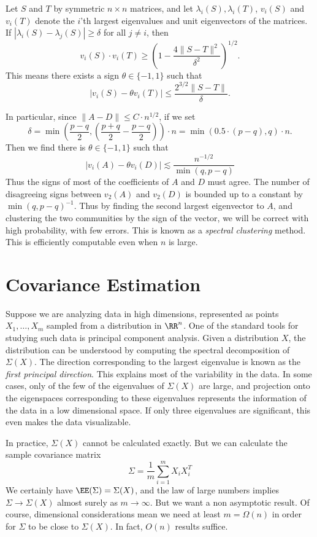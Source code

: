 \begin{theorem}
	Let $S$ and $T$ by symmetric $n \times n$ matrices, and let $\lambda_i(S), \lambda_i(T)$, $v_i(S)$ and $v_i(T)$ denote the $i$'th largest eigenvalues and unit eigenvectors of the matrices. If $|\lambda_i(S) - \lambda_j(S)| \geq \delta$ for all $j \neq i$, then
	\[ v_i(S) \cdot v_i(T) \geq \left( 1 - \frac{4 \| S - T \|^2}{\delta^2} \right)^{1/2}. \]
	This means there exists a sign $\theta \in \{ -1, 1 \}$ such that
	\[ |v_i(S) - \theta v_i(T)| \leq \frac{2^{3/2} \| S - T \|}{\delta}. \]
\end{theorem}

In particular, since $\| A - D \| \leq C \cdot n^{1/2}$, if we set
%
\[ \delta = \min \left( \frac{p - q}{2}, \left( \frac{p + q}{2} - \frac{p - q}{2} \right) \right) \cdot n = \min(0.5 \cdot (p-q), q) \cdot n. \]
%
Then we find there is $\theta \in \{ -1 , 1 \}$ such that
%
\[ |v_i(A) - \theta v_i(D)| \lesssim \frac{n^{-1/2}}{\min(q,p-q)} \]
%
Thus the signs of most of the coefficients of $A$ and $D$ must agree. The number of disagreeing signs between $v_2(A)$ and $v_2(D)$ is bounded up to a constant by $\min(q,p-q)^{-1}$. Thus by finding the second largest eigenvector to $A$, and clustering the two communities by the sign of the vector, we will be correct with high probability, with few errors. This is known as a \emph{spectral clustering} method. This is efficiently computable even when $n$ is large.

\section{Covariance Estimation}

Suppose we are analyzing data in high dimensions, represented as points $X_1, \dots, X_m$ sampled from a distribution in $\RR^n$. One of the standard tools for studying such data is principal component analysis. Given a distribution $X$, the distribution can be understood by computing the spectral decomposition of $\Sigma(X)$. The direction corresponding to the largest eigenvalue is known as the \emph{first principal direction}. This explains most of the variability in the data. In some cases, only of the few of the eigenvalues of $\Sigma(X)$ are large, and projection onto the eigenspaces corresponding to these eigenvalues represents the information of the data in a low dimensional space. If only three eigenvalues are significant, this even makes the data visualizable.

In practice, $\Sigma(X)$ cannot be calculated exactly. But we can calculate the sample covariance matrix
%
\[ \Sigma = \frac{1}{m} \sum_{i = 1}^m X_i X_i^T \]
%
We certainly have $\EE(\Sigma) = \Sigma(X)$, and the law of large numbers implies $\Sigma \to \Sigma(X)$ almost surely as $m \to \infty$. But we want a non asymptotic result. Of course, dimensional considerations mean we need at least $m = \Omega(n)$ in order for $\Sigma$ to be close to $\Sigma(X)$. In fact, $O(n)$ results suffice.

